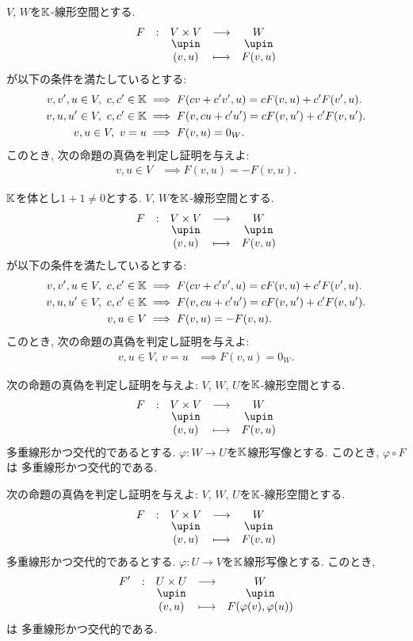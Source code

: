 \begin{quiz}
  $V$, $W$を$\mathbb{K}$-線形空間とする.
  \begin{align*}
    \shazo{F}{V\times V}{W}
    {(v,u)}{F(v,u)}
  \end{align*}
  が以下の条件を満たしているとする:
  \begin{align*}
    v, v', u \in V,\ c, c'\in \mathbb{K} &\implies F(cv+c'v',u)=cF(v,u)+c'F(v',u).\\
    v, u, u' \in V,\ c, c'\in \mathbb{K} &\implies F(v,cu+c'u')=cF(v,u')+c'F(v,u').\\
    v, u \in V,\ v=u &\implies F(v,u)=0_W.
  \end{align*}
  このとき, 次の命題の真偽を判定し証明を与えよ:
  \begin{align*}
    v, u \in V &\implies F(v,u)=-F(v,u).
  \end{align*}
\end{quiz}

\begin{quiz}
  $\mathbb{K}$を体とし$1+1\neq 0$とする.
  $V$, $W$を$\mathbb{K}$-線形空間とする.
  \begin{align*}
    \shazo{F}{V\times V}{W}
    {(v,u)}{F(v,u)}
  \end{align*}
  が以下の条件を満たしているとする:
  \begin{align*}
    v, v', u \in V,\ c, c'\in \mathbb{K} &\implies F(cv+c'v',u)=cF(v,u)+c'F(v',u).\\
    v, u, u' \in V,\ c, c'\in \mathbb{K} &\implies F(v,cu+c'u')=cF(v,u')+c'F(v,u').\\
    v, u \in V &\implies F(v,u)=-F(v,u).
  \end{align*}
  このとき, 次の命題の真偽を判定し証明を与えよ:
  \begin{align*}
    v, u \in V,\ v=u &\implies F(v,u)=0_W.
  \end{align*}
\end{quiz}

\begin{quiz}
  次の命題の真偽を判定し証明を与えよ:
  $V$, $W$, $U$を$\mathbb{K}$-線形空間とする.
  \begin{align*}
    \shazo{F}{V\times V}{W}
    {(v,u)}{F(v,u)}
  \end{align*}
  多重線形かつ交代的であるとする.
  $\varphi\colon W\to U$を$\mathbb{K}$線形写像とする.
  このとき, $\varphi\circ F$は
    多重線形かつ交代的である.
\end{quiz}

\begin{quiz}
  次の命題の真偽を判定し証明を与えよ:
  $V$, $W$, $U$を$\mathbb{K}$-線形空間とする.
  \begin{align*}
    \shazo{F}{V\times V}{W}
    {(v,u)}{F(v,u)}
  \end{align*}
  多重線形かつ交代的であるとする.
  $\varphi\colon U\to V$を$\mathbb{K}$線形写像とする.
  このとき,
  \begin{align*}
    \shazo{F'}{U\times U}{W}
    {(v,u)}{F(\varphi(v),\varphi(u))}
  \end{align*}
  は
  多重線形かつ交代的である.
\end{quiz}


